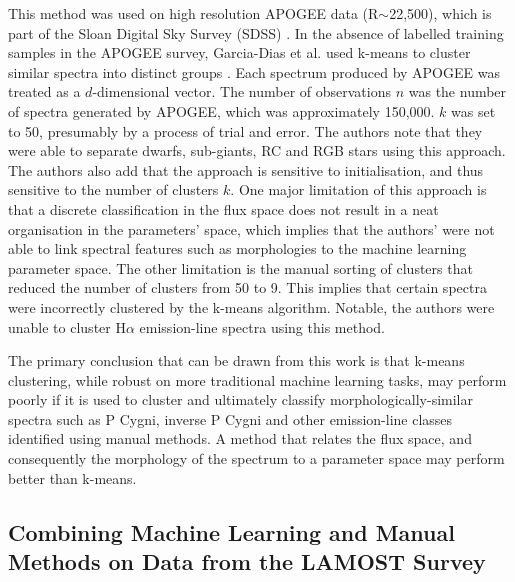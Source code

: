 This method was used on high resolution APOGEE data (R$\sim$22,500), which is part of the Sloan Digital Sky Survey (SDSS) \citep{eisenstein2001spectroscopic, blanton2017sloan}. In the absence of labelled training samples in the APOGEE survey, Garcia-Dias et al. used k-means to cluster similar spectra into distinct groups \citep{garcia2018machine}. Each spectrum produced by APOGEE was treated as a $d$-dimensional vector. The number of observations $n$ was the number of spectra generated by APOGEE, which was approximately 150,000. $k$ was set to 50, presumably by a process of trial and error. The authors note that they were able to separate dwarfs, sub-giants, RC and RGB stars using this approach. The authors also add that the approach is sensitive to initialisation, and thus sensitive to the number of clusters $k$. One major limitation of this approach is that a discrete classification in the flux space does not result in a neat organisation in the parameters' space, which implies that the authors' were not able to link spectral features such as morphologies to the machine learning parameter space. The other limitation is the manual sorting of clusters that reduced the number of clusters from 50 to 9. This implies that certain spectra were incorrectly clustered by the k-means algorithm. Notable, the authors were unable to cluster H$\alpha$ emission-line spectra using this method. 

The primary conclusion that can be drawn from this work is that k-means clustering, while robust on more traditional machine learning tasks, may perform poorly if it is used to cluster and ultimately classify morphologically-similar spectra such as P Cygni, inverse P Cygni and other emission-line classes identified using manual methods. A method that relates the flux space, and consequently the morphology of the spectrum to a parameter space may perform better than k-means. 

\subsection{Combining Machine Learning and Manual Methods on Data from the LAMOST Survey}

